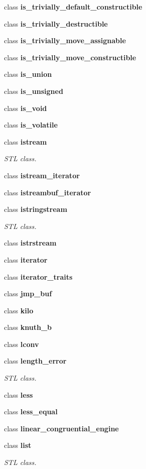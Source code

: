 \begin{DoxyCompactItemize}
class \textbf{ is\+\_\+trivially\+\_\+default\+\_\+constructible}
\item 
class \textbf{ is\+\_\+trivially\+\_\+destructible}
\item 
class \textbf{ is\+\_\+trivially\+\_\+move\+\_\+assignable}
\item 
class \textbf{ is\+\_\+trivially\+\_\+move\+\_\+constructible}
\item 
class \textbf{ is\+\_\+union}
\item 
class \textbf{ is\+\_\+unsigned}
\item 
class \textbf{ is\+\_\+void}
\item 
class \textbf{ is\+\_\+volatile}
\item 
class \textbf{ istream}
\begin{DoxyCompactList}\small\item\em S\+TL class. \end{DoxyCompactList}\item 
class \textbf{ istream\+\_\+iterator}
\item 
class \textbf{ istreambuf\+\_\+iterator}
\item 
class \textbf{ istringstream}
\begin{DoxyCompactList}\small\item\em S\+TL class. \end{DoxyCompactList}\item 
class \textbf{ istrstream}
\item 
class \textbf{ iterator}
\item 
class \textbf{ iterator\+\_\+traits}
\item 
class \textbf{ jmp\+\_\+buf}
\item 
class \textbf{ kilo}
\item 
class \textbf{ knuth\+\_\+b}
\item 
class \textbf{ lconv}
\item 
class \textbf{ length\+\_\+error}
\begin{DoxyCompactList}\small\item\em S\+TL class. \end{DoxyCompactList}\item 
class \textbf{ less}
\item 
class \textbf{ less\+\_\+equal}
\item 
class \textbf{ linear\+\_\+congruential\+\_\+engine}
\item 
class \textbf{ list}
\begin{DoxyCompactList}\small\item\em S\+TL class. \end{DoxyCompactList}\item 

\end{DoxyCompactItemize}
